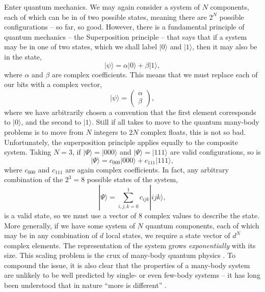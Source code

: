Enter quantum mechanics. We may again consider a system of \(N\) components, each of which can be in of two possible states, meaning there are \(2^{N}\) possible configurations -- so far, so good. However, there is a fundamental principle of quantum mechanics -- the Superposition principle -- that says that if a system may be in one of two states, which we shall label \(|0 \rangle\) and \(|1\rangle\), then it may also be in the state,
\begin{equation}
	| \psi \rangle = \alpha |0\rangle + \beta |1\rangle,
	\label{eq:mbq1-1}
\end{equation}
where \(\alpha\) and \(\beta\) are complex coefficients. This means that we must replace each of our bits with a complex vector,
\begin{equation}
	|\psi \rangle = \begin{pmatrix}
						\alpha \\
						\beta
					\end{pmatrix},
	\label{eq:mbq1-2}
\end{equation}
where we have arbitrarily chosen a convention that the first element corresponds to \(|0\rangle\), and the second to \(|1\rangle\). Still if all takes to move to the quantum many-body problems is to move from \(N\) integers to \(2N\) complex floats, this is not so bad. Unfortunately, the superposition principle applies equally to the composite system. Taking \(N=3\), if \(|\Psi\rangle = |000\rangle\) and \(|\Psi\rangle = |111\rangle\) are valid configurations, so is 
\begin{equation}  
	| \Psi \rangle = c_{000}|000 \rangle + c_{111}| 111 \rangle,
	\label{eq:mbq1-3}
\end{equation}
where \(c_{000}\) and \(c_{111}\) are again complex coefficients. In fact, any arbitrary combination of the \(2^{3} = 8\) possible states of the system,
\begin{equation}
	| \Psi \rangle = \sum^{1}_{i,j,k=0} c_{ijk} |ijk \rangle,
	\label{eq:mbq1-4}
\end{equation}
is a valid state, so we must use a vector of 8 complex values to describe the state. More generally, if we have some system of \(N\) quantum components, each of which may be in any combination of \(d\) local states, we require a state vector of \(d^{N}\) complex elements. The representation of the system grows \emph{exponentially} with its size. This scaling problem is the crux of many-body quantum physics \cite{Barnett_MS,NielsenChuang_CS}. To compound the issue, it is also clear that the properties of a many-body system are unlikely to be well predicted by single- or even few-body systems -- it has long been understood that in nature ``more is different'' \cite{Anderson72}.

